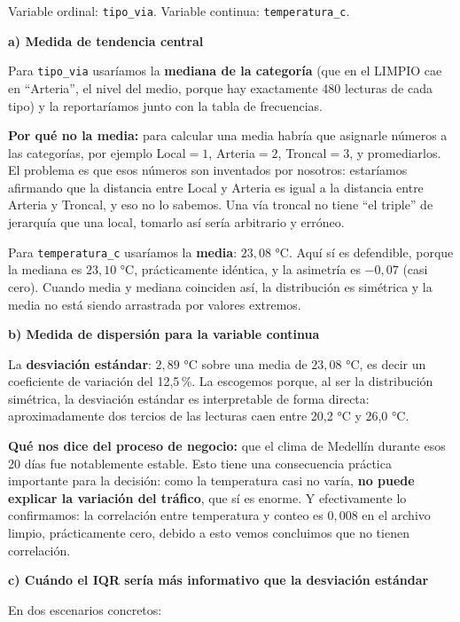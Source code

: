 \documentclass[11pt]{article}
\begin{document}
\begin{respuesta}[Respuesta 1.2]
Variable ordinal: \texttt{tipo\_via}. Variable continua: \texttt{temperatura\_c}.

\medskip
\noindent\textbf{a) Medida de tendencia central}

Para \texttt{tipo\_via} usaríamos la \textbf{mediana de la categoría} (que en el LIMPIO cae en ``Arteria'', el nivel del medio, porque hay exactamente 480 lecturas de cada tipo) y la reportaríamos junto con la tabla de frecuencias.

\textbf{Por qué no la media:} para calcular una media habría que asignarle números a las categorías, por ejemplo Local$=1$, Arteria$=2$, Troncal$=3$, y promediarlos. El problema es que esos números son inventados por nosotros: estaríamos afirmando que la distancia entre Local y Arteria es igual a la distancia entre Arteria y Troncal, y eso no lo sabemos. Una vía troncal no tiene ``el triple'' de jerarquía que una local, tomarlo así sería arbitrario y erróneo.

Para \texttt{temperatura\_c} usaríamos la \textbf{media}: $23{,}08$ °C. Aquí sí es defendible, porque la mediana es $23{,}10$ °C, prácticamente idéntica, y la asimetría es $-0{,}07$ (casi cero). Cuando media y mediana coinciden así, la distribución es simétrica y la media no está siendo arrastrada por valores extremos.

\medskip
\noindent\textbf{b) Medida de dispersión para la variable continua}

La \textbf{desviación estándar}: $2{,}89$ °C sobre una media de $23{,}08$ °C, es decir un coeficiente de variación del 12,5\,\%. La escogemos porque, al ser la distribución simétrica, la desviación estándar es interpretable de forma directa: aproximadamente dos tercios de las lecturas caen entre 20,2 °C y 26,0 °C.

\textbf{Qué nos dice del proceso de negocio:} que el clima de Medellín durante esos 20 días fue notablemente estable. Esto tiene una consecuencia práctica importante para la decisión: como la temperatura casi no varía, \textbf{no puede explicar la variación del tráfico}, que sí es enorme. Y efectivamente lo confirmamos: la correlación entre temperatura y conteo es $0{,}008$ en el archivo limpio, prácticamente cero, debido a esto vemos concluimos que no tienen correlación.

\medskip
\noindent\textbf{c) Cuándo el IQR sería más informativo que la desviación estándar}

En dos escenarios concretos:


\end{respuesta}
\end{document}
